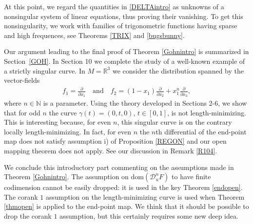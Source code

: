 \documentclass[12pt, reqno]{amsart}
\theoremstyle{plain}
\theoremstyle{definition}
\theoremstyle{remark}
\numberwithin{equation}{section}
\newcommand{\R}{\mathbb{R}}
\newcommand{\N}{\mathbb{N}}
\newcommand{\0}{\theta}
\newcommand{\1}{{-1}}
\newcommand{\m}{n}
\renewcommand{\=}{\coloneqq}
\renewcommand{\.}{\dots}
\newcommand{\mc}{\mathcal}
\newcommand{\dom}{\mathrm{dom}}
\begin{document}
At this point,  we regard
the quantities in \eqref{DELTAintro} as    unknowns  of a nonsingular system of linear equations, thus proving their vanishing.  
To get this nonsingularity, we   work with families of trigonometric functions having sparse and high frequences, see Theorems \ref{TRIX} and  \ref{bugsbunny}.  






Our   argument leading to the final proof of Theorem \ref{Gohnintro} is summarized in  Section~\ref{GOH}.
In Section 10 we complete the study of a well-known example of {\color{black} a strictly  singular} curve.  
In $M =\R^3$  we consider the distribution spanned by the vector-fields
\begin{align}
\label{eq:vfieldsintro}
f_1=\frac{\partial}{\partial x_1} \quad \textrm{and}\quad
f_2=(1-x_1)\frac{\partial}{\partial x_2}+x_1^\m \frac{\partial}{\partial x_3},
\end{align}
where   $\m\in \N$ is a parameter. Using the theory developed in Sections 2-6,  we 
 show that for odd $\m$ the curve $\gamma(t) = (0,t,0)$, $t\in[0,1]$,  is not length-minimizing.
This is   interesting   because, for even $\m$, this singular curve is on the contrary   locally length-minimizing.
In fact, for even $n$ the $n$th differential of the end-point map  does not satisfy assumption i) of Proposition  \ref{REGON} and our open mapping theorem does not apply. See our discussion in Remark \ref{R104}.







We conclude this introductory part commenting on the assumptions made in Theorem \ref{Gohnintro}. {\color{black}
The assumption on $\dom(\mc D_u^n F)$ to have finite codimension cannot be easily dropped:
it is used in the key   Theorem \ref{endopen}.}  The corank $1$ assumption on the length-minimizing curve  is used when Theorem \ref{thmopen}
is applied to the end-point map. We think that it should be possible to drop the corank $1$ assumption, 
but this certainly requires some new deep idea.


\medskip
\end{document}

